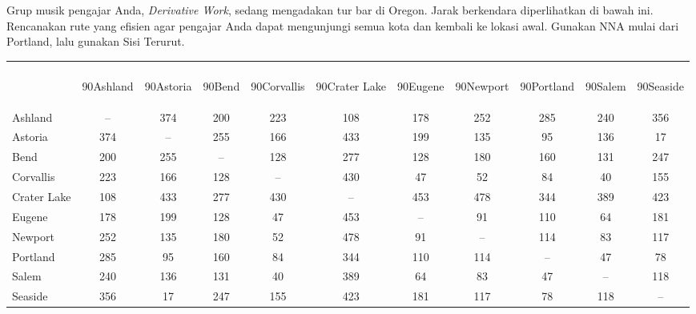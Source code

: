 \begin{example}{} %
Grup musik pengajar Anda, \textit{Derivative Work}, sedang mengadakan tur bar di Oregon.  Jarak berkendara diperlihatkan di bawah ini.  Rencanakan rute yang efisien agar pengajar Anda dapat mengunjungi semua kota dan kembali ke lokasi awal.  Gunakan NNA mulai dari Portland, lalu gunakan Sisi Terurut.
\begin{center}
\begin{tabular}{|l|c|c|c|c|c|c|c|c|c|c|}
\hline
&&&&&&&&&&\\[7ex]
& \begin{rotate}{90}Ashland \end{rotate}& \begin{rotate}{90}Astoria\end{rotate}  & \begin{rotate}{90}Bend \end{rotate}& \begin{rotate}{90}Corvallis \end{rotate} & \begin{rotate}{90}Crater Lake \end{rotate} &  \begin{rotate}{90}Eugene  \end{rotate}&  \begin{rotate}{90}Newport \end{rotate} &  \begin{rotate}{90}Portland  \end{rotate}& \begin{rotate}{90}Salem \end{rotate} &  \begin{rotate}{90}Seaside \end{rotate}\\
\hline
Ashland & --&374&200&223&108&178&252&285&240&356\\
\hline
Astoria & 374&--&255&166&433&199&135&95&136&17\\
\hline
Bend & 200 & 255 &--&128&277&128&180 & 160&131&247\\
\hline
Corvallis&223&166&128&--&430&47&52&84&40&155\\
\hline
Crater Lake &108&433&277&430&--&453&478&344&389&423\\
\hline
Eugene &178&199&128&47&453&--&91&110&64&181\\
\hline
Newport&252&135&180&52&478&91&--&114&83&117\\
\hline
Portland &285&95&160&84&344&110&114&--&47&78\\
\hline
Salem & 240 &136&131&40&389&64&83&47&--&118\\
\hline
Seaside&356&17&247&155&423&181&117&78&118&--\\
\hline
\end{tabular}
\end{center}


\end{example}
